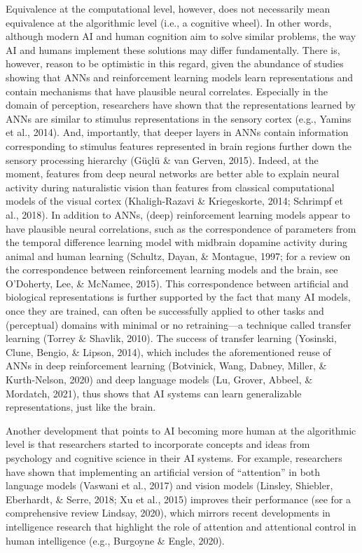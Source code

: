 Equivalence at the computational level, however, does not necessarily
mean equivalence at the algorithmic level (i.e., a cognitive wheel).
In other words, although modern AI and human cognition aim to solve
similar problems, the way AI and humans implement these solutions
may differ fundamentally.
There is, however, reason to be optimistic in this regard, given
the abundance of studies showing that ANNs and reinforcement
learning models learn representations and contain mechanisms
that have plausible neural correlates.
Especially in the domain of perception, researchers have shown
that the representations learned by ANNs are similar to stimulus
representations in the sensory cortex (e.g., Yamins et al., 2014).
And, importantly, that deeper layers in ANNs contain information
corresponding to stimulus features represented in brain regions
further down the sensory processing hierarchy
(Güçlü \& van Gerven, 2015).
Indeed, at the moment, features from deep neural networks are better
able to explain neural activity during naturalistic vision than
features from classical computational models of the visual cortex
(Khaligh-Razavi \& Kriegeskorte, 2014; Schrimpf et al., 2018).
In addition to ANNs, (deep) reinforcement learning models appear
to have plausible neural correlations, such as the correspondence
of parameters from the temporal difference learning model with
midbrain dopamine activity during animal and human learning
(Schultz, Dayan, \& Montague, 1997; for a review on the correspondence
between reinforcement learning models and the brain, see
O'Doherty, Lee, \& McNamee, 2015).
This correspondence between artificial and biological representations
is further supported by the fact that many AI models, once they are
trained, can often be successfully applied to other tasks and
(perceptual) domains with minimal or no retraining---a technique
called transfer learning (Torrey \& Shavlik, 2010).
The success of transfer learning
(Yosinski, Clune, Bengio, \& Lipson, 2014), which includes the
aforementioned reuse of ANNs in deep reinforcement learning
(Botvinick, Wang, Dabney, Miller, \& Kurth-Nelson, 2020) and deep
language models (Lu, Grover, Abbeel, \& Mordatch, 2021), thus shows
that AI systems can learn generalizable representations,
just like the brain.

Another development that points to AI becoming more human at the
algorithmic level is that researchers started to incorporate concepts
and ideas from psychology and cognitive science in their AI systems.
For example, researchers have shown that implementing an artificial
version of ``attention'' in both language models
(Vaswani et al., 2017) and vision models
(Linsley, Shiebler, Eberhardt, \& Serre, 2018; Xu et al., 2015)
improves their performance (see for a comprehensive review
Lindsay, 2020), which mirrors recent developments in intelligence
research that highlight the role of attention and attentional control
in human intelligence (e.g., Burgoyne \& Engle, 2020).

